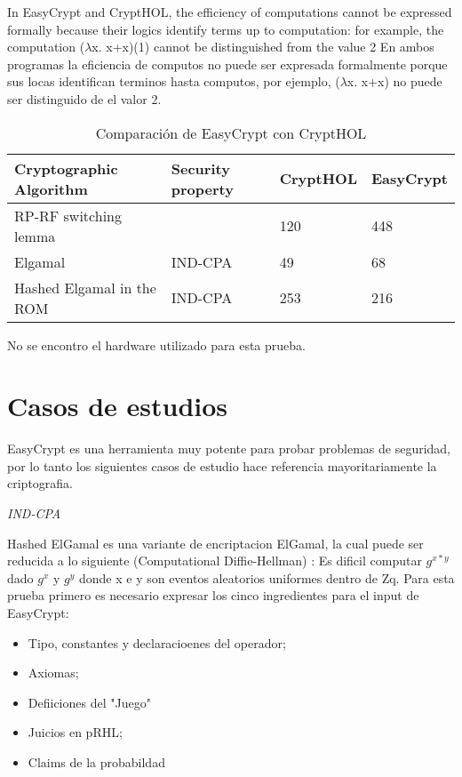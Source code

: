 \documentclass[runningheads,a4paper]{llncs}
\begin{document}
In EasyCrypt and CryptHOL, the efficiency of computations
cannot be expressed formally because their logics identify terms up to computation:
for example, the computation ($\lambda$x. x+x)(1) cannot be distinguished from the value 2
En ambos programas la eficiencia de computos no puede ser expresada formalmente porque sus locas identifican terminos hasta computos, por ejemplo, ($\lambda$x. x+x) no puede ser distinguido de el valor 2.\cite{article8}

\begin{table}
  \caption{Comparación de EasyCrypt con CryptHOL}
  \label{tab:simple2}
  \centering
  \begin{tabular}{ |p{4cm}|p{1.5cm}|p{1.5cm}|p{1.5cm}|  }
 \hline
 Cryptographic Algorithm & Security property & CryptHOL & EasyCrypt\\\cline{1-4}
 \hline
 RP-RF switching lemma &  & 120 & 448\\
 Elgamal & IND-CPA & 49  & 68\\
 Hashed Elgamal in the ROM & IND-CPA & 253 &  216\\
 \hline
\end{tabular}
\end{table}


No se encontro el hardware utilizado para esta prueba.




\section{Casos de estudios}
EasyCrypt es una herramienta muy potente para probar problemas de seguridad, por lo tanto los siguientes casos de estudio hace referencia mayoritariamente la criptografia.

\centerline{\emph{IND-CPA}}

Hashed ElGamal es una variante de encriptacion ElGamal, la cual puede ser reducida a lo siguiente (Computational Diffie-Hellman) : Es dificil computar $g^{x*y}$ dado $g^x$ y $g^y$ donde x e y son eventos aleatorios uniformes dentro de Zq.
Para esta prueba primero es necesario expresar los cinco ingredientes para el input de EasyCrypt:
\begin{itemize}
	\item Tipo, constantes y declaracioenes del operador;
	\item Axiomas;
	\item Defiiciones del "Juego"
	\item Juicios en pRHL;
	\item Claims de la probabildad
\end{itemize}
\end{document}
